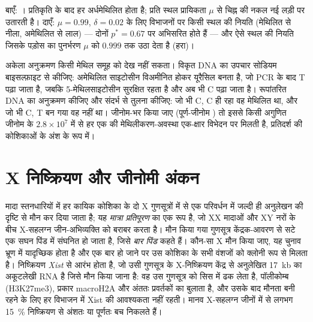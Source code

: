 \begin{omfigure}
{\small बाएँ: । प्रतिकृति के बाद हर  अर्धमेथिलित
होता है;  प्रति स्थल प्रायिकता $\mu$ से चिह्न की नकल नई लड़ी पर
उतारती है। दाएँ: $\mu = 0.99$, $\delta = 0.02$ के लिए विभाजनों पर किसी
स्थल की नियति (मेथिलित से नीला, अमेथिलित से लाल) --- दोनों
$p^{*} = 0.67$ पर अभिसरित होते हैं --- और ऐसे स्थल की नियति जिसके पड़ोस का
पुनर्भरण $\mu$ को $0.999$ तक उठा देता है (हरा)।}
\end{omfigure}

\begin{method}\label{met:b3:chromatin-epigenetics:bisulfite}
अकेला अनुक्रमण किसी मेथिल समूह को देख नहीं सकता। विकृत DNA का उपचार
सोडियम बाइसल्फ़ाइट से कीजिए: अमेथिलित साइटोसीन विअमीनित होकर यूरैसिल
बनता है, जो PCR के बाद T पढ़ा जाता है, जबकि 5-मेथिलसाइटोसीन सुरक्षित
रहता है और अब भी C पढ़ा जाता है। रूपांतरित DNA का अनुक्रमण कीजिए और
संदर्भ से तुलना कीजिए: जो भी C, C ही रहा वह मेथिलित था, और जो भी C, T
बन गया वह नहीं था। जीनोम-भर किया जाए (पूर्ण-जीनोम )
तो इससे किसी अगुणित जीनोम के $2.8\times 10^{7}$  में से हर एक की
मेथिलीकरण-अवस्था एक-क्षार विभेदन पर मिलती है, प्रतिदर्श की कोशिकाओं के
अंश के रूप में।
\end{method}

\section{X निष्क्रियण और जीनोमी अंकन}

\begin{definition}[X-गुणसूत्र निष्क्रियण]\label{def:b3:chromatin-epigenetics:x-inactivation}
मादा स्तनधारियों में हर कायिक कोशिका के दो X गुणसूत्रों में से एक
परिवर्धन में जल्दी ही अनुलेखन की दृष्टि से मौन कर दिया जाता है; यह
\emph{मात्रा प्रतिपूरण} का एक रूप है, जो XX मादाओं और XY नरों के बीच
X-सहलग्न जीन-अभिव्यक्ति को बराबर करता है। मौन किया गया गुणसूत्र
केंद्रक-आवरण से सटे एक सघन पिंड में संघनित हो जाता है, जिसे
\emph{बार पिंड} कहते हैं। कौन-सा X मौन किया जाए, यह चुनाव भ्रूण में
यादृच्छिक होता है और एक बार हो जाने पर उस कोशिका के सभी वंशजों को
क्लोनी रूप से मिलता है। निष्क्रियण \emph{Xist} से आरंभ होता है, जो
उसी गुणसूत्र के X-निष्क्रियण केंद्र से अनुलेखित \qty{17}{kb} का
अकूटलेखी RNA है जिसे मौन किया जाना है: वह उस गुणसूत्र को सिस में ढक
लेता है, पॉलीकोम्ब (H3K27me3),  प्रकार macroH2A और अंततः
प्रवर्तकों का  बुलाता है, और उसके बाद मौनता बनी रहने के
लिए हर विभाजन में Xist की आवश्यकता नहीं रहती। मानव X-सहलग्न जीनों में
से लगभग \qty{15}{\%} निष्क्रियण से अंशतः या पूर्णतः बच निकलते हैं।
\end{definition}

